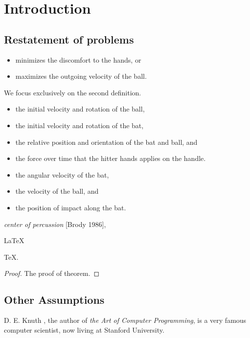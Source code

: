 \documentclass{mcmthesis}
\begin{document}
\thispagestyle{empty}
\newpage
\tableofcontents
\newpage
\setcounter{page}{1}
\section{Introduction}

\subsection{Restatement of problems}


\begin{itemize}
\item minimizes the discomfort to the hands, or
\item maximizes the outgoing velocity of the ball.
\end{itemize}
We focus exclusively on the second definition.

\begin{itemize}
\item the initial velocity and rotation of the ball,
\item the initial velocity and rotation of the bat,
\item the relative position and orientation of the bat and ball, and
\item the force over time that the hitter hands applies on the handle.
\end{itemize}

\begin{itemize}
\item the angular velocity of the bat,
\item the velocity of the ball, and
\item the position of impact along the bat.
\end{itemize}

\emph{center of percussion} [Brody 1986],



\begin{Theorem} \label{thm:latex}
\LaTeX
\end{Theorem}

\begin{Lemma} \label{thm:tex}
\TeX .
\end{Lemma}

\begin{proof}
The proof of theorem.
\end{proof}


\subsection{Other Assumptions}
D. E. Knuth \cite{Knuth},
the author of \textit{the Art of Computer Programming},
is a very famous computer scientist,
now living at Stanford University.
\end{document}
